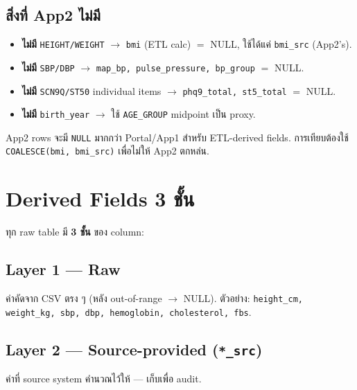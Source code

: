 \documentclass[11pt,a4paper]{article}
\begin{document}
\subsection{สิ่งที่ App2 ไม่มี}

\begin{itemize}[leftmargin=*, itemsep=1pt]
  \item \textbf{ไม่มี} \texttt{HEIGHT/WEIGHT} $\rightarrow$ \texttt{bmi} (ETL calc) $=$ NULL,
    ใช้ได้แค่ \texttt{bmi\_src} (App2's).
  \item \textbf{ไม่มี} \texttt{SBP/DBP} $\rightarrow$ \texttt{map\_bp, pulse\_pressure, bp\_group} $=$ NULL.
  \item \textbf{ไม่มี} \texttt{SCN9Q/ST50} individual items $\rightarrow$ \texttt{phq9\_total, st5\_total} $=$ NULL.
  \item \textbf{ไม่มี} \texttt{birth\_year} $\rightarrow$ ใช้ \texttt{AGE\_GROUP} midpoint เป็น proxy.
\end{itemize}

App2 rows จะมี \texttt{NULL} มากกว่า Portal/App1 สำหรับ ETL-derived fields.
การเทียบต้องใช้ \texttt{COALESCE(bmi, bmi\_src)} เพื่อไม่ให้ App2 ตกหล่น.

\section{Derived Fields 3 ชั้น}

ทุก raw table มี \textbf{3 ชั้น} ของ column:

\subsection{Layer 1 --- Raw}

ค่าคัดจาก CSV ตรง ๆ (หลัง out-of-range $\rightarrow$ NULL).
ตัวอย่าง: \texttt{height\_cm, weight\_kg, sbp, dbp, hemoglobin, cholesterol, fbs}.

\subsection{Layer 2 --- Source-provided (\texttt{*\_src})}

ค่าที่ source system คำนวณไว้ให้ --- เก็บเพื่อ audit.
\end{document}

